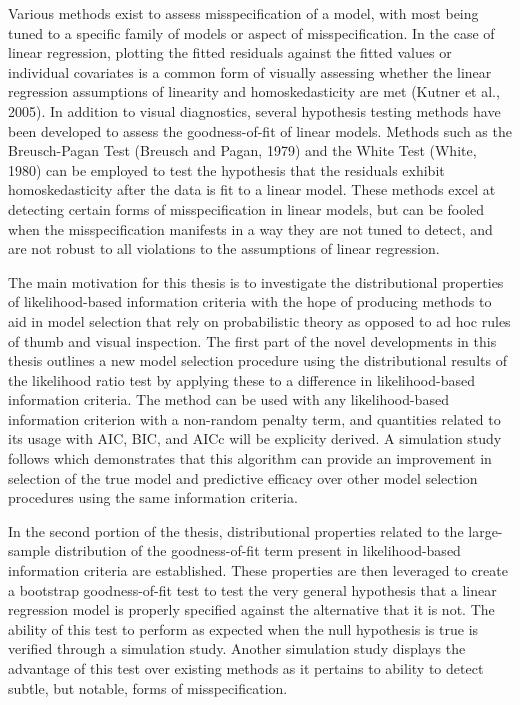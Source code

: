 		Various methods exist to assess misspecification of a model, with most being tuned to a specific family of models or aspect of misspecification. In the case of linear regression,
		plotting the fitted residuals against the fitted values or individual covariates is a common form of visually assessing whether the linear regression assumptions of linearity and
		homoskedasticity are met (Kutner et al., 2005). In addition to visual diagnostics, several hypothesis testing methods have been developed to assess the goodness-of-fit of linear
		models. Methods such as the Breusch-Pagan Test (Breusch and Pagan, 1979) and the White Test (White, 1980) can be employed to test the hypothesis that the residuals exhibit homoskedasticity
		after the data is fit to a linear model. These methods excel at detecting certain forms of misspecification in linear models, but can be fooled when the misspecification manifests in a
		way they are not tuned to detect, and are not robust to all violations to the assumptions of linear regression.

		The main motivation for this thesis is to investigate the distributional properties of likelihood-based information criteria with the hope of producing methods to aid in model selection
		that rely on probabilistic theory as opposed to ad hoc rules of thumb and visual inspection. The first part of the novel developments in this thesis outlines a new model selection procedure using the distributional
		results of the likelihood ratio test by applying these to a difference in likelihood-based information criteria. The method can be used with any likelihood-based information criterion
		with a non-random penalty term, and quantities related to its usage with AIC, BIC, and AICc will be explicity derived. A simulation study follows which demonstrates that this algorithm
		can provide an improvement in selection of the true model and predictive efficacy over other model selection procedures using the same information criteria.
		
		In the second portion of the thesis, distributional properties related to the large-sample distribution of the goodness-of-fit term present in likelihood-based information criteria
		are established. These properties are then leveraged to create a bootstrap goodness-of-fit test to test the very general hypothesis that a linear regression model is properly specified
		against the alternative that it is not. The ability of this test to perform as expected when the null hypothesis is true is verified through a simulation study. Another simulation
		study displays the advantage of this test over existing methods as it pertains to ability to detect subtle, but notable, forms of misspecification.

